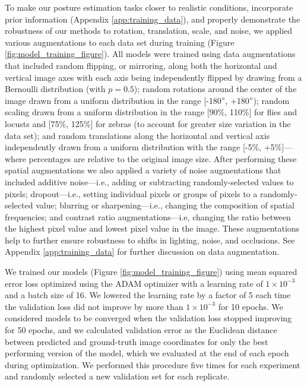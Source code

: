 \documentclass[11pt,a4paper,oneside]{book}
\begin{document}
\begin{doublespace}
To make our posture estimation tasks closer to realistic conditions, incorporate prior information (Appendix \ref{app:training_data}), and properly demonstrate the robustness of our methods to rotation, translation, scale, and noise, we applied various augmentations to each data set during training (Figure \ref{fig:model_training_figure}). All models were trained using data augmentations that included random flipping, or mirroring, along both the horizontal and vertical image axes with each axis being independently flipped by drawing from a Bernoulli distribution (with $p=0.5$); random rotations around the center of the image drawn from a uniform distribution in the range [-180$\degree$, +180$\degree$); random scaling drawn from a uniform distribution in the range [90\%, 110\%] for flies and locusts and [75\%, 125\%] for zebras (to account for greater size variation in the data set); and random translations along the horizontal and vertical axis independently drawn from a uniform distribution with the range [-5\%, +5\%]---where percentages are relative to the original image size. After performing these spatial augmentations we also applied a variety of noise augmentations that included additive noise---i.e., adding or subtracting randomly-selected values to pixels; dropout---i.e., setting individual pixels or groups of pixels to a randomly-selected value; blurring or sharpening---i.e., changing the composition of spatial frequencies; and contrast ratio augmentations---i.e, changing the ratio between the highest pixel value and lowest pixel value in the image. These augmentations help to further ensure robustness to shifts in lighting, noise, and occlusions. See Appendix \ref{app:training_data} for further discussion on data augmentation.

We trained our models (Figure \ref{fig:model_training_figure}) using mean squared error loss optimized using the ADAM optimizer \citep{kingma2014adam} with a learning rate of $1\times10^{-3}$ and a batch size of 16. We lowered the learning rate by a factor of 5 each time the validation loss did not improve by more than $1\times10^{-3}$ for 10 epochs. We considered models to be converged when the validation loss stopped improving for 50 epochs, and we calculated validation error as the Euclidean distance between predicted and ground-truth image coordinates for only the best performing version of the model, which we evaluated at the end of each epoch during optimization. We performed this procedure five times for each experiment and randomly selected a new validation set for each replicate.


\end{doublespace}
\end{document}

